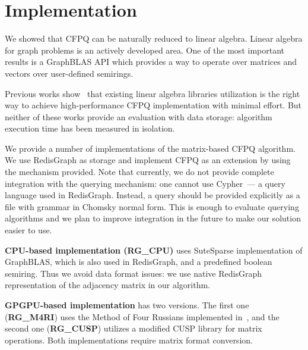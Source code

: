\section{Implementation}

We showed that CFPQ can be naturally reduced to linear algebra.
Linear algebra for graph problems is an actively developed area.
One of the most important results is a GraphBLAS API which provides a way to operate over matrices and vectors over user-defined semirings.

Previous works show~\cite{Mishin:2019:ECP:3327964.3328503, Azimov:2018:CPQ:3210259.3210264} that existing linear algebra libraries utilization is the right way to achieve high-performance CFPQ implementation with minimal effort.
But neither of these works provide an evaluation with data storage: algorithm execution time has been measured in isolation.

We provide a number of implementations of the matrix-based CFPQ algorithm.
We use RedisGraph as storage and implement CFPQ as an extension by using the mechanism provided.
Note that currently, we do not provide complete integration with the querying mechanism: one cannot use Cypher~--- a query language used in RedisGraph.
Instead, a query should be provided explicitly as a file with grammar in Chomsky normal form.
This is enough to evaluate querying algorithms and we plan to improve integration in the future to make our solution easier to use. 

\textbf{CPU-based implementation (RG\_CPU)} uses SuteSparse implementation of GraphBLAS, which is also used in RedisGraph, and a predefined boolean semiring.
Thus we avoid data format issues: we use native RedisGraph representation of the adjacency matrix in our algorithm.

\textbf{GPGPU-based implementation} has two versions.
The first one (\textbf{RG\_M4RI}) uses the Method of Four Russians implemented in~\cite{Mishin:2019:ECP:3327964.3328503}, and the second one (\textbf{RG\_CUSP}) utilizes a modified CUSP library for matrix operations.
Both implementations require matrix format conversion.

